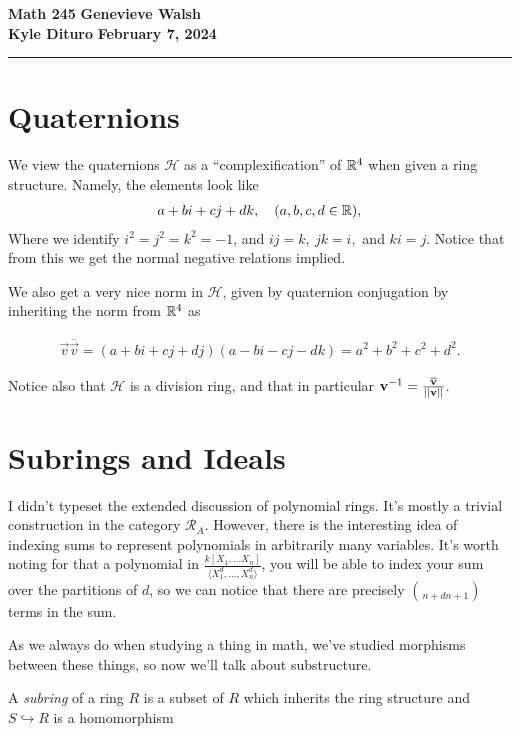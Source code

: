 \documentclass[12pt, twosided]{article}
\begin{document}
\noindent \textbf{Math 245} \hfill \textbf{Genevieve Walsh} \\
\textbf{Kyle Dituro} \hfill \textbf{February 7\tht, 2024}\hrule
\vspace{.2in}

\section{Quaternions}

We view the quaternions \(\mathcal{H}\) as a ``complexification'' of \(\mathbb{R}^4\) when given a ring structure. Namely, the elements look like
\begin{align*}
  a + bi + cj + dk, \quad (a,b,c,d \in \mathbb{R}),
\end{align*}
Where we identify \(i^2 = j^2 = k^2 = -1\), and \( ij = k,\ jk = i,\) and \(ki = j\). Notice that from this we get the normal negative relations implied.

We also get a very nice norm in \(\mathcal{H}\), given by quaternion conjugation by inheriting the norm from \(\mathbb{R}^4\) as

\begin{align*}
  \vec v \overline{\vec v} = (a + bi + cj + dj)(a -bi -cj - dk) = a^2 + b^2 + c^2 + d^2.
\end{align*}

Notice also that \(\mathcal{H}\) is a division ring, and that in particular \(\mathbf{v}^{-1} = \frac{\overline{\mathbf{v}}}{||\mathbf{v}||}\).

\section{Subrings and Ideals}
\begin{note}
  I didn't typeset the extended discussion of polynomial rings. It's mostly a trivial construction in the category \(\mathcal{R}_A\). However, there is the interesting idea of indexing sums to represent polynomials in arbitrarily many variables. It's worth noting for that a polynomial in \(\frac{k[X_1, \ldots X_n]}{\langle X_1^d, \ldots, X_n^d \rangle}\), you will be able to index your sum over the partitions of \(d\), so we can notice that there are precisely \(\choose{n + d}{n + 1}\) terms in the sum.
\end{note}

As we always do when studying a thing in math, we've studied morphisms between these things, so now we'll talk about substructure.
\begin{df}
  A \textit{subring} of a ring \(R\) is a subset of \(R\) which inherits the ring structure and \(S \hookrightarrow R\) is a homomorphism
\end{df}
\end{document}
